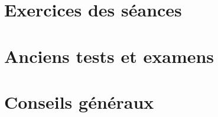 

\chapter{Exercices des séances}


\chapter{Anciens tests et examens}



\chapter{Conseils généraux}


